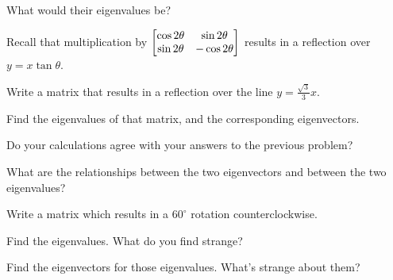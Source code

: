 \documentclass[../gatm_answers.tex]{subfiles}
\begin{document}
\begin{inner_problem}
\item What would their eigenvalues be?
\end{inner_problem}

\begin{outer_problem}
\item Recall that multiplication by $\begin{bmatrix} \cos 2\theta & \sin 2\theta \\ \sin 2\theta & -\cos 2\theta \end{bmatrix}$ results in a reflection over $y=x\tan \theta$.
\end{outer_problem}

\begin{inner_problem}[start=1]
\item Write a matrix that results in a reflection over the line $y=\frac{\sqrt{3}}{3}x.$
\end{inner_problem}

\begin{inner_problem}
\item Find the eigenvalues of that matrix, and the corresponding eigenvectors.
\end{inner_problem}

\begin{inner_problem}
\item Do your calculations agree with your answers to the previous problem?
\end{inner_problem}

\begin{inner_problem}
\item What are the relationships between the two eigenvectors and between the two eigenvalues?
\end{inner_problem}

\begin{outer_problem}
\item
\end{outer_problem}

\begin{inner_problem}[start=1]
\item Write a matrix which results in a $60^\circ$ rotation counterclockwise.
\end{inner_problem}

\begin{inner_problem}
\item Find the eigenvalues. What do you find strange?
\end{inner_problem}

\begin{inner_problem}
\item Find the eigenvectors for those eigenvalues. What's strange about them?
\end{inner_problem}
\end{document}
